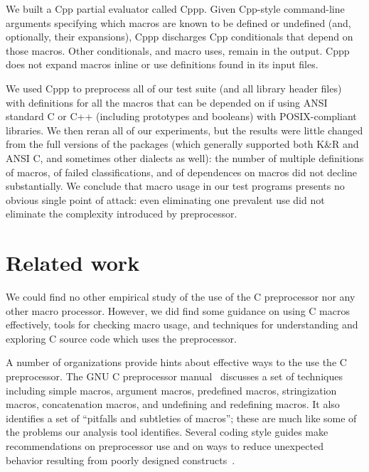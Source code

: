 \documentclass[10pt]{article}
\begin{document}
We built a Cpp partial evaluator called Cppp.  Given Cpp-style command-line
arguments specifying which macros are known to be defined or undefined
(and, optionally, their expansions), Cppp discharges Cpp conditionals that
depend on those macros.  Other conditionals, and macro uses, remain in the
output.  Cppp does not expand macros inline or use definitions found in its
input files.


We used Cppp to preprocess all of our test suite (and all library header
files) with definitions for all the macros that can be depended on if using
ANSI standard C or C++ (including prototypes and booleans) with
POSIX-compliant libraries.  We then reran all of our experiments, but the
results were little changed from the full versions of the packages (which
generally supported both K\&R and ANSI C, and sometimes other dialects as
well): the number of multiple definitions of macros, of failed
classifications, and of dependences on macros did not decline
substantially.  We conclude that macro usage in our test programs presents
no obvious single point of attack: even eliminating one prevalent use did
not eliminate the complexity introduced by preprocessor.


\section{Related work}
\label{sec:related}


We could find no other empirical study of the use of the C preprocessor
nor any other macro processor.  However, we did find some guidance on
using C macros effectively, tools for checking macro usage, and
techniques for understanding and exploring C source code which uses the
preprocessor.

A number of organizations provide hints about effective ways to the use the
C preprocessor.  The GNU C preprocessor manual~\cite{cpp-manual} discusses
a set of techniques including simple macros, argument macros, predefined
macros, stringization macros, concatenation macros, and undefining and
redefining macros.  It also identifies a set of ``pitfalls and subtleties
of macros''; these are much like some of the problems our analysis tool
identifies.  Several coding style guides make recommendations on
preprocessor use and on ways to reduce unexpected behavior resulting from
poorly designed constructs~\cite{Stallman97,ellemtel92,Cannon95,Dolenc90}.
\end{document}
